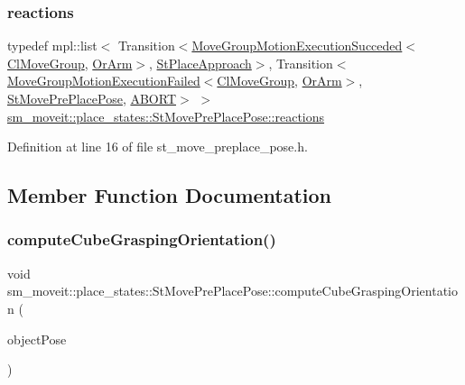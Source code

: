 \subsubsection{\texorpdfstring{reactions}{reactions}}
{\footnotesize\ttfamily typedef mpl\+::list$<$ Transition$<$\hyperlink{structmove__group__interface__client_1_1MoveGroupMotionExecutionSucceded}{Move\+Group\+Motion\+Execution\+Succeded}$<$\hyperlink{classmove__group__interface__client_1_1ClMoveGroup}{Cl\+Move\+Group}, \hyperlink{classsm__moveit_1_1OrArm}{Or\+Arm}$>$, \hyperlink{structsm__moveit_1_1place__states_1_1StPlaceApproach}{St\+Place\+Approach}$>$, Transition$<$\hyperlink{structmove__group__interface__client_1_1MoveGroupMotionExecutionFailed}{Move\+Group\+Motion\+Execution\+Failed}$<$\hyperlink{classmove__group__interface__client_1_1ClMoveGroup}{Cl\+Move\+Group}, \hyperlink{classsm__moveit_1_1OrArm}{Or\+Arm}$>$, \hyperlink{structsm__moveit_1_1place__states_1_1StMovePrePlacePose}{St\+Move\+Pre\+Place\+Pose}, \hyperlink{classABORT}{A\+B\+O\+RT}$>$ $>$ \hyperlink{structsm__moveit_1_1place__states_1_1StMovePrePlacePose_aba9e304feab2249eac1087dd2e4f6719}{sm\+\_\+moveit\+::place\+\_\+states\+::\+St\+Move\+Pre\+Place\+Pose\+::reactions}}



Definition at line 16 of file st\+\_\+move\+\_\+preplace\+\_\+pose.\+h.



\subsection{Member Function Documentation}
\mbox{\label{structsm__moveit_1_1place__states_1_1StMovePrePlacePose_add6f85ba0aa1e3905645881ecd0ba4e1}} 
\subsubsection{\texorpdfstring{compute\+Cube\+Grasping\+Orientation()}{computeCubeGraspingOrientation()}}
{\footnotesize\ttfamily void sm\+\_\+moveit\+::place\+\_\+states\+::\+St\+Move\+Pre\+Place\+Pose\+::compute\+Cube\+Grasping\+Orientation (\begin{DoxyParamCaption}\item[{geometry\+\_\+msgs\+::\+Pose\+Stamped \&}]{object\+Pose }\end{DoxyParamCaption})\hspace{0.3cm}{\ttfamily [inline]}}



